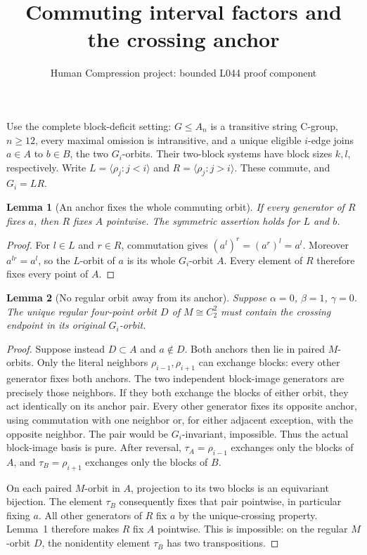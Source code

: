 \documentclass[11pt,a4paper]{article}
\title{Commuting interval factors and the crossing anchor}
\author{Human Compression project: bounded L044 proof component}
\date{}
\newtheorem{lemma}{Lemma}
\newcommand{\gen}[1]{\langle#1\rangle}
\begin{document}
\maketitle
Use the complete block-deficit setting: $G\leq A_n$ is a transitive
string C-group, $n\geq12$, every maximal omission is intransitive,
and a unique eligible $i$-edge joins $a\in A$ to $b\in B$, the two
$G_i$-orbits. Their two-block systems have block sizes $k,l$, respectively. Write $L=\gen{\rho_j:j<i}$
and $R=\gen{\rho_j:j>i}$. These commute, and $G_i=LR$.

\begin{lemma}[An anchor fixes the whole commuting orbit]
If every generator of $R$ fixes $a$, then $R$ fixes $A$ pointwise.
The symmetric assertion holds for $L$ and $b$.
\end{lemma}
\begin{proof}
For $l\in L$ and $r\in R$, commutation gives
$(a^l)^r=(a^r)^l=a^l$. Moreover $a^{lr}=a^l$, so the
$L$-orbit of $a$ is its whole $G_i$-orbit $A$.
Every element of $R$ therefore fixes every point of $A$.
\end{proof}

\begin{lemma}[No regular orbit away from its anchor]
Suppose $\alpha=0$, $\beta=1$, $\gamma=0$. The unique regular
four-point orbit $D$ of $M\cong C_2^2$ must contain the crossing
endpoint in its original $G_i$-orbit.
\end{lemma}
\begin{proof}
Suppose instead $D\subset A$ and $a\notin D$.
Both anchors then lie in paired $M$-orbits. Only the literal
neighbors $\rho_{i-1},\rho_{i+1}$ can exchange blocks: every
other generator fixes both anchors. The two independent
block-image generators are precisely those neighbors.
If they both exchange the blocks of either orbit, they act
identically on its anchor pair. Every other generator fixes
its opposite anchor, using commutation with one neighbor or,
for either adjacent exception, with the opposite neighbor.
The pair would be $G_i$-invariant, impossible.
Thus the actual block-image basis is pure. After reversal,
$\tau_A=\rho_{i-1}$ exchanges only the blocks of $A$, and
$\tau_B=\rho_{i+1}$ exchanges only the blocks of $B$.

On each paired $M$-orbit in $A$, projection to its two blocks
is an equivariant bijection. The element $\tau_B$ consequently
fixes that pair pointwise, in particular fixing $a$.
All other generators of $R$ fix $a$ by the unique-crossing
property. Lemma~1 therefore makes $R$ fix $A$ pointwise.
This is impossible: on the regular $M$-orbit $D$, the
nonidentity element $\tau_B$ has two transpositions.
\end{proof}
\end{document}
